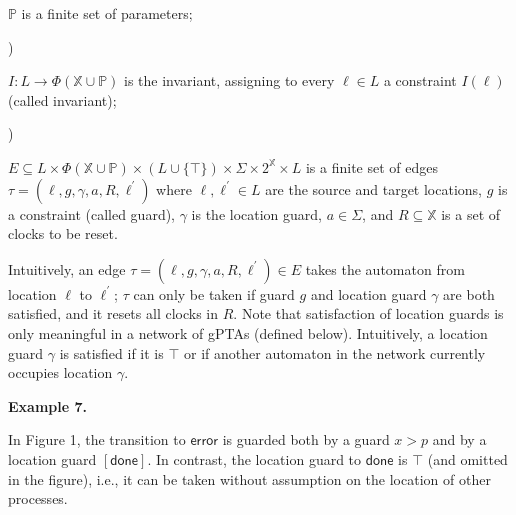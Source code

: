 \documentclass[10pt,a4paper]{article}
\begin{document}
$\mathbb{P}$ is a finite set of parameters;\par
 
 
 
\par{}) 
 
$I:L\to\Phi(\mathbb{X}\cup\mathbb{P})$ is the invariant, assigning to every $\mathrm{\ell}\in L$ a constraint $I(\mathrm{\ell})$ (called invariant);\par
 
 
 
\par{}) 
 
$E\subseteq L\times\Phi(\mathbb{X}\cup\mathbb{P})\times\left(L\cup\{\top\}\right)\times\Sigma\times 2^{\mathbb{X}}\times L$ is a finite set of edges $\tau=(\mathrm{\ell},g,\gamma,a,R,\mathrm{\ell}^{\prime})$ where $\mathrm{\ell},\mathrm{\ell}^{\prime}\in L$ are the source and target locations, $g$ is a constraint (called guard), $\gamma$ is the location guard, $a\in\Sigma$, and $R\subseteq\mathbb{X}$ is a set of clocks to be reset.\par
 
 
  
 
 
 
Intuitively, an edge $\tau=(\mathrm{\ell},g,\gamma,a,R,\mathrm{\ell}^{\prime})\in E$ takes the automaton from location $\mathrm{\ell}$ to $\mathrm{\ell}^{\prime}$; $\tau$ can only be taken if guard $g$ and location guard $\gamma$ are both satisfied, and it resets all clocks in $R$. Note that satisfaction of location guards is only meaningful in a network of gPTAs (defined below). Intuitively, a location guard $\gamma$ is satisfied if it is $\top$ or if another automaton in the network currently occupies location $\gamma$.\par
 
 
 
\par\medskip\noindent\textbf{Example 7.}\par
 
 
In Figure 1, the transition to $\mathsf{error}$ is guarded both by a guard $x>p$ and by a location guard $[\mathsf{done}]$. In contrast, the location guard to $\mathsf{done}$ is $\top$ (and omitted in the figure), i.e., it can be taken without assumption on the location of other processes.\par
 
\end{document}
